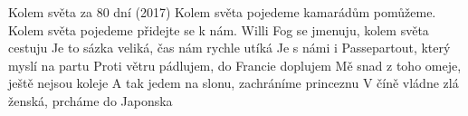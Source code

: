 \begin{TEXT}{Kolem světa za 80 dní (2017)}
\REFREN Kolem světa pojedeme
kamarádům pomůžeme.
Kolem světa pojedeme
přidejte se k nám.
\SLOKA Willi Fog se jmenuju, kolem světa cestuju
\SLOKA Je to sázka veliká, čas nám rychle utíká
\SLOKA Je s námi i Passepartout, který myslí na partu
\SLOKA Proti větru pádlujem, do Francie doplujem
\SLOKA Mě snad z toho omeje, ještě nejsou koleje
\SLOKA A tak jedem na slonu, zachráníme princeznu
\SLOKA V číně vládne zlá ženská, prcháme do Japonska
\end{TEXT}
